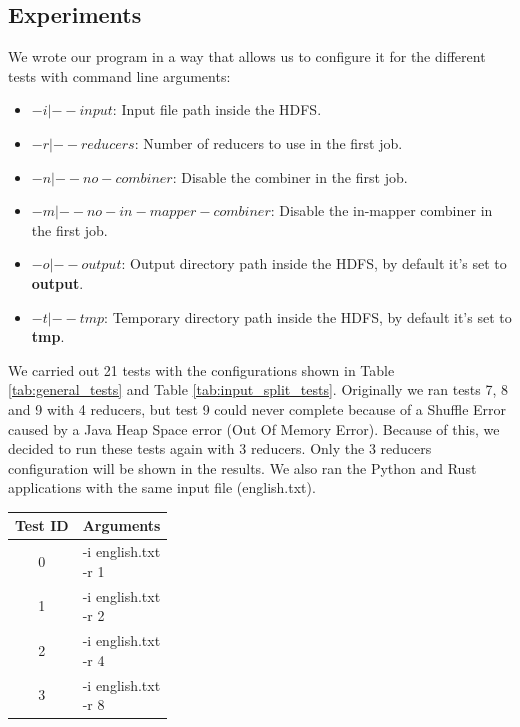 \documentclass{article}
\begin{document}
\begin{multicols}{2}
\section{Experiments}
    We wrote our program in a way that allows us to configure it for the different tests with 
    command line arguments:
    \begin{itemize}
        \item \textbf{$-i|--input$}: Input file path inside the HDFS.
        \item \textbf{$-r|--reducers$}: Number of reducers to use in the first job.
        \item \textbf{$-n|--no-combiner$}: Disable the combiner in the first job.
        \item \textbf{$-m|--no-in-mapper-combiner$}: Disable the in-mapper combiner in the first job.
        \item \textbf{$-o|--output$}: Output directory path inside the HDFS, 
        by default it's set to \textbf{output}.
        \item \textbf{$-t|--tmp$}: Temporary directory path inside the HDFS,
        by default it's set to \textbf{tmp}.
    \end{itemize}
    We carried out 21 tests with the configurations shown in 
    Table \ref{tab:general_tests} and Table \ref{tab:input_split_tests}.
    Originally we ran tests 7, 8 and 9 with 4 reducers, but test 9 could never complete because of a 
    Shuffle Error caused by a Java Heap Space error (Out Of Memory Error). Because of this, 
    we decided to run these tests again with 3 reducers.
    Only the 3 reducers configuration will be shown in the results.
    We also ran the Python and Rust applications with the same input file (english.txt).
    \begin{table}[H]
        \centering
        \begin{tabular}{|c|l|}
            \hline
            Test ID & Arguments \\
            \hline
            0 & \makecell[l]{-i english.txt \\ -r 1} \\        
            \hline
            1 & \makecell[l]{-i english.txt \\ -r 2} \\        
            \hline
            2 & \makecell[l]{-i english.txt \\ -r 4} \\        
            \hline
            3 & \makecell[l]{-i english.txt \\ -r 8} \\        

\end{tabular}
\end{table}
\end{multicols}
\end{document}
